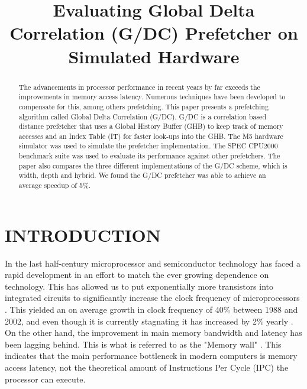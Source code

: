 \documentclass[conference]{IEEEtran}
\begin{document}
\graphicspath{ {./assets/} }

\title{Evaluating Global Delta Correlation (G/DC) Prefetcher on Simulated Hardware}

\author{ \and {}}

\maketitle


\begin{abstract}
The advancements in processor performance in recent years by far exceeds the improvements in memory access latency. Numerous techniques have been developed to compensate for this, among others prefetching. This paper presents a prefetching algorithm called Global Delta Correlation (G/DC). G/DC is a correlation based distance prefetcher that uses a Global History Buffer (GHB) to keep track of memory accesses and an Index Table (IT) for faster look-ups into the GHB. The M5 hardware simulator was used to simulate the prefetcher implementation. The SPEC CPU2000 benchmark suite was used to evaluate its performance against other prefetchers. The paper also compares the three different implementations of the G/DC scheme, which is width, depth and hybrid. We found the G/DC prefetcher was able to achieve an average speedup of 5\%. 
\end{abstract}


\section{INTRODUCTION}

In the last half-century microprocessor and semiconductor technology has faced a rapid development in an effort to match the ever growing dependence on technology. This has allowed us to put exponentially more transistors into integrated circuits to significantly increase the clock frequency of microprocessors \cite{b3}. This yielded an on average growth in clock frequency of 40\% between 1988 and 2002, and even though it is currently stagnating it has increased by 2\% yearly \cite{b11}. On the other hand, the improvement in main memory bandwidth and latency has been lagging behind. This is what is referred to as the "Memory wall" \cite{b4}. This indicates that the main performance bottleneck in modern computers is memory access latency, not the theoretical amount of Instructions Per Cycle (IPC) the processor can execute.
\end{document}
